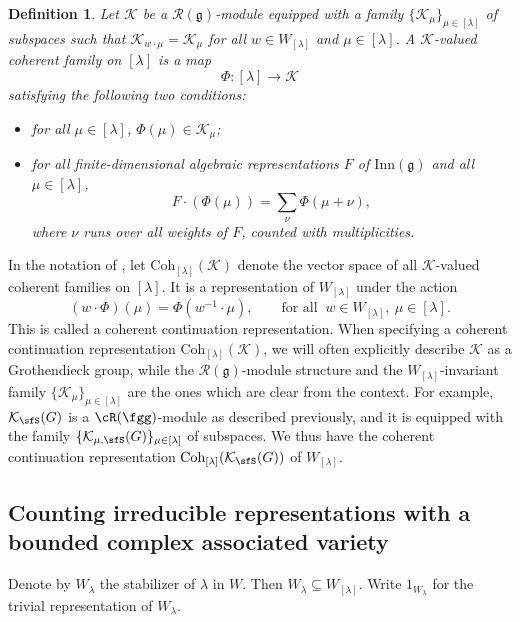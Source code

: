 \documentclass[12pt,a4paper]{amsart}
\def\subset{\subseteq}
\newcommand{\CK}{{\mathcal {K}}}
\newcommand{\g}{\mathfrak g}
\numberwithin{equation}{section}
\newtheorem{defn}[thm]{Definition}
\theoremstyle{remark}
\def\Coh{\mathrm{Coh}}
\newcommand{\Lam}{{[\lambda]}}
\newcommand{\Rg}{\cR(\fgg)}
\begin{document}
\begin{defn}\label{defcoh}
  Let $\CK$ be a $\mathcal R(\g)$-module equipped with a family
  $\{\CK_\mu\}_{\mu\in \Lam}$ of subspaces such that $\CK_{w \cdot \mu}=\CK_\mu$
  for all $w\in W_\Lam$ and $\mu\in \Lam$. A $\CK$-valued coherent family on
  $\Lam$ is a map
  \[
    \Phi: \Lam\rightarrow \CK%
  \]
  satisfying the following two conditions:
  \begin{itemize}
    \item for all $\mu\in \Lam$, $\Phi(\mu)\in \CK_\mu$;
    \item for all finite-dimensional algebraic representations $F$ of $\mathrm{Inn}(\g)$
          and all $\mu\in \Lam$,
          \[
          F \cdot (\Phi(\mu)) = \sum_{\nu} \Phi(\mu+\nu),
          \]
          where $\nu$ runs over all weights of $F$, counted with multiplicities.%
  \end{itemize}
\end{defn}


In the notation of , let $\Coh_{\Lam}(\CK)$ denote the
vector space of all $\mathcal K$-valued coherent families on $\Lam$. It is a
representation of $W_{\Lam}$ under the action
\[
  (w \cdot \Phi)(\mu) = \Phi(w^{-1}\cdot \mu), \qquad \textrm{for all
  }\ w\in W_\Lam, \ \mu\in \Lam.
\]
This is called a coherent continuation representation. When specifying a coherent continuation representation $\Coh_{\Lam}(\CK)$, we will often explicitly describe $\CK$ as a Grothendieck group, while the $\mathcal R(\g)$-module structure and the $W_\Lam$-invariant family  $\{\CK_\mu\}_{\mu\in \Lam}$ are the ones which are clear from the context.
For example, $\CK_\sfS(G)$ is a $\Rg$-module as described previously, and it is equipped with the family $\{\CK_{\mu, \sfS}(G)\}_{\mu\in \Lam}$ of subspaces. We thus have the coherent continuation representation $\Coh_{\Lam}(\CK_\sfS(G))$ of $W_\Lam$.




\subsection{Counting irreducible representations with a bounded complex
  associated variety} %

Denote by $W_\lambda$ the stabilizer of
$\lambda$ in $W$. Then $W_\lambda\subset W_\Lam$. Write $1_{W_\lambda}$ for the
trivial representation of $W_{\lambda}$.
\end{document}
